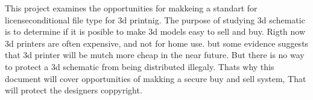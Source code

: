 This project examines the opportunities for makkeing a standart for licenseconditional file type for 3d printnig.
The purpose of studying 3d schematic is to determine if it is posible to make 3d models easy to sell and buy.
Rigth now 3d printers are often expensive, and not for home use. but some evidence suggests that 3d printer will be mutch more cheap in the near future.
But there is no way to protect a 3d schematic from being distributed illegaly. Thats why this document will cover opportunities of makking a secure buy and sell system, That will protect the designers coppyright.